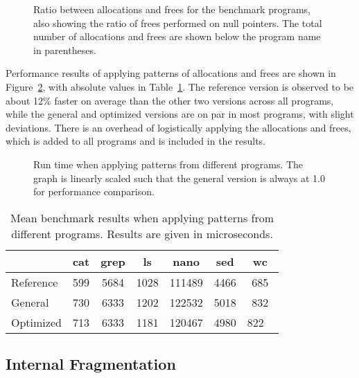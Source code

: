 \begin{figure}[h]
    \centering
    
    \caption{Ratio between allocations and frees for the benchmark programs, also showing the ratio of frees performed on null pointers. The total number of allocations and frees are shown below the program name in parentheses.}
    \label{fig:program_ratios}
\end{figure}

Performance results of applying patterns of allocations and frees are shown in Figure~\ref{fig:program_benchmarks}, with absolute values in Table~\ref{table:program_benchmarks}. The reference version is observed to be about 12\% faster on average than the other two versions across all programs, while the general and optimized versions are on par in most programs, with slight deviations. There is an overhead of logistically applying the allocations and frees, which is added to all programs and is included in the results.

\begin{figure}[h]
    \centering
    
    \caption{Run time when applying patterns from different programs. The graph is linearly scaled such that the general version is always at 1.0 for performance comparison.}
    \label{fig:program_benchmarks}
\end{figure}

\begin{table}[h]
    \centering
    \begin{tabular}{l|cccccc}
    {} & {cat} & {grep} & {ls} & {nano} & {sed} & {wc} \\
    \hline
    Reference & 599 & 5684 & 1028 & 111489 & 4466 & 685 \\
    General   & 730 & 6333 & 1202 & 122532 & 5018 & 832 \\
    Optimized & 713 & 6333 & 1181 & 120467 & 4980 & 822 \
    \end{tabular}
    \caption{Mean benchmark results when applying patterns from different programs. Results are given in microseconds.}
    \label{table:program_benchmarks}
\end{table}

\FloatBarrier

\subsection{Internal Fragmentation}

